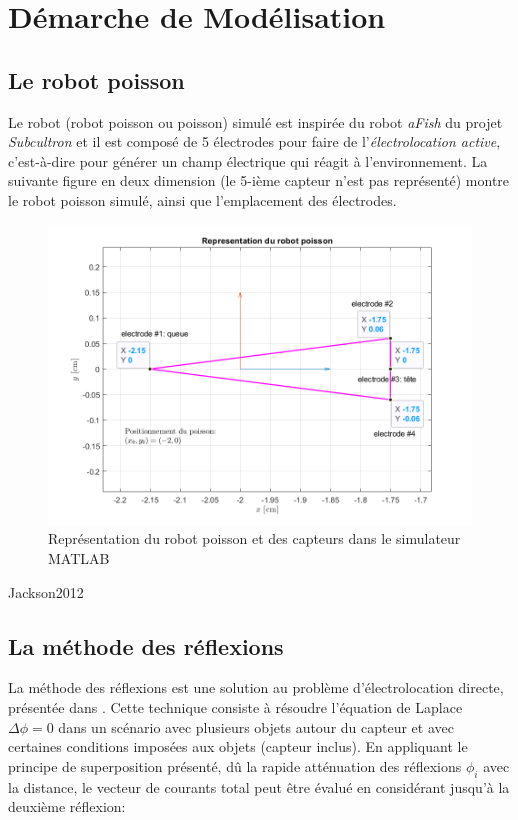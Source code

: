 \section{Démarche de Modélisation}
\subsection{Le robot poisson}

Le robot (robot poisson ou poisson) simulé est inspirée du robot \textit{aFish} du projet \textit{Subcultron} et il est composé de 5 électrodes pour faire de l'\textit{électrolocation active}, c'est-à-dire pour générer un champ électrique qui réagit à l'environnement. La suivante figure en deux dimension (le 5-ième capteur n'est pas représenté) montre le robot poisson simulé, ainsi que l'emplacement des électrodes. 

\begin{figure}[h!]
    \centering
    \includegraphics[width=\textwidth]{assets/poisson/poisson.png}
    \caption{Représentation du robot poisson et des capteurs dans le simulateur MATLAB}
    \label{fig:poisson}
\end{figure}Jackson2012

\subsection{La méthode des réflexions}
La \og méthode des réflexions \fg{ } est une solution au problème d'électrolocation directe, présentée dans \cite{Boyer2012}. Cette technique consiste à résoudre l'équation de Laplace $\Delta\phi = 0$ dans un scénario avec plusieurs objets autour du capteur et avec certaines conditions imposées aux objets (capteur inclus). En appliquant le principe de superposition présenté, dû la rapide atténuation des réflexions $\phi_i$ avec la distance, le vecteur de courants total peut être évalué en considérant jusqu'à la deuxième réflexion: 

